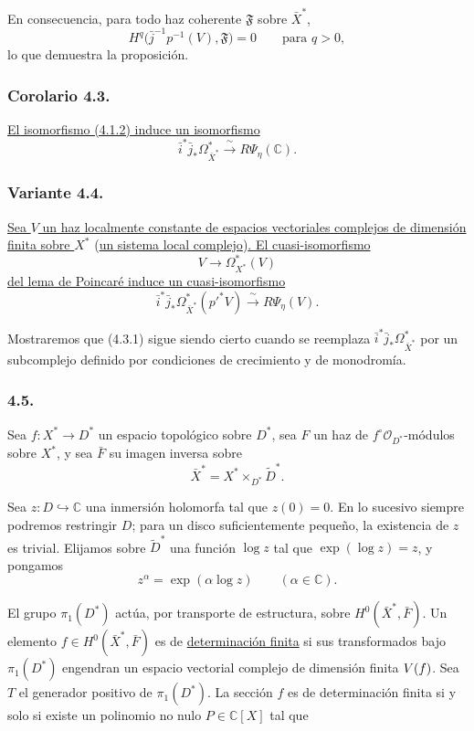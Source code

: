 \pageoriginale

En consecuencia, para todo haz coherente $\mathfrak F$ sobre
$\bar X^*$,
\[
H^q\bigl(\bar j^{-1}p^{-1}(V),\mathfrak F\bigr)=0
\qquad\text{para }q>0,
\]
lo que demuestra la proposición.

\subsubsection*{Corolario 4.3.}
\underline{El isomorfismo (4.1.2) induce un isomorfismo}
\begin{equation}\tag{4.3.1}
\bar i^*\bar j_*\Omega_{\bar X^*}^*
\xrightarrow{\ \sim\ }R\Psi_\eta(\mathbb C).
\end{equation}

\subsubsection*{Variante 4.4.}
\underline{Sea $V$ un haz localmente constante de espacios vectoriales
complejos de dimensión finita sobre $X^*$} (\underline{un sistema local complejo})\underline{.
El cuasi-isomorfismo}
\[
V\longrightarrow\Omega_{X^*}^*(V)
\]
\underline{del lema de Poincaré induce un cuasi-isomorfismo}
\begin{equation}\tag{4.4.1}
\bar i^*\bar j_*\Omega_{\bar X^*}^*(p'^*V)
\xrightarrow{\ \sim\ }R\Psi_\eta(V).
\end{equation}

Mostraremos que (4.3.1) sigue siendo cierto cuando se reemplaza
$\bar i^*\bar j_*\Omega_{\bar X^*}^*$ por un subcomplejo definido por
condiciones de crecimiento y de monodromía.

\subsubsection*{4.5.}
Sea $f:X^*\longrightarrow D^*$ un espacio topológico sobre $D^*$,
sea $F$ un haz de $f^\circ\mathcal O_{D^*}$-módulos sobre $X^*$, y
sea $\bar F$ su imagen inversa sobre
\[
\bar X^*=X^*\times_{D^*}\widetilde D^*.
\]

Sea $z:D\hookrightarrow\mathbb C$ una inmersión holomorfa tal que
$z(0)=0$. En lo sucesivo siempre podremos restringir $D$; para un disco
suficientemente pequeño, la existencia de $z$ es trivial. Elijamos sobre
$\widetilde D^*$ una función $\log z$ tal que $\exp(\log z)=z$, y
pongamos
\[
z^\alpha=\exp(\alpha\log z)
\qquad(\alpha\in\mathbb C).
\]

El grupo $\pi_1(D^*)$ actúa, por transporte de estructura, sobre
$H^0(\bar X^*,\bar F)$. Un elemento $f\in H^0(\bar X^*,\bar F)$ es de
\underline{determinación finita} si sus transformados bajo
$\pi_1(D^*)$ engendran un espacio vectorial complejo de dimensión finita
$V(\sisi{F}{f})$. Sea $T$ el generador positivo de $\pi_1(D^*)$. La
sección $f$ es de determinación finita si y solo si existe un polinomio
no nulo $P\in\mathbb C[X]$ tal que

